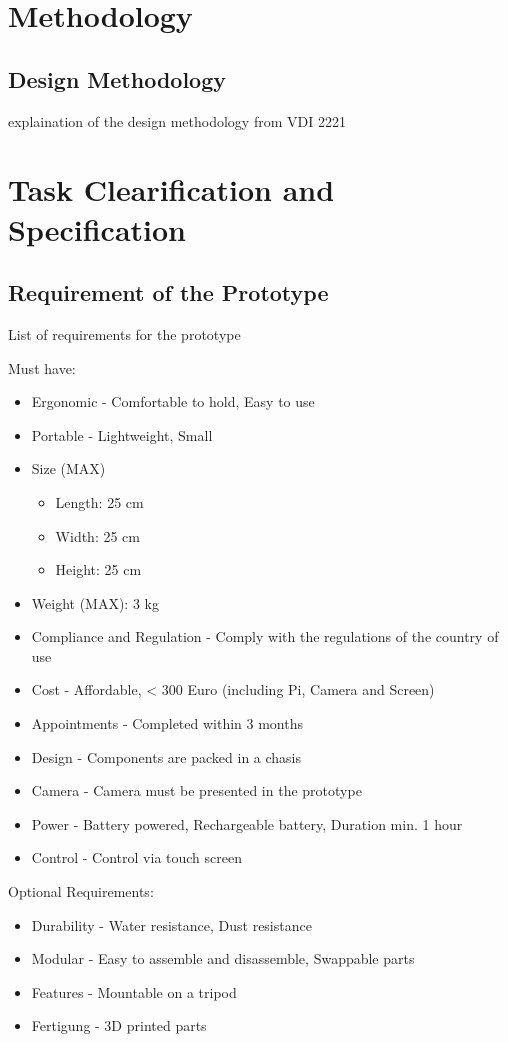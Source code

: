 \chapter{Methodology}

\section{Design Methodology}
explaination of the design methodology from VDI 2221 \cite{Klaus13}


\chapter{Task Clearification and Specification}
\section{Requirement of the Prototype}
\label{sec:requirement}
List of requirements for the prototype

Must have:
\begin{itemize}
    \item Ergonomic - Comfortable to hold, Easy to use
    \item Portable - Lightweight, Small
    \item Size (MAX)
          \begin{itemize}
              \item Length: 25 cm
              \item Width: 25 cm
              \item Height: 25 cm
          \end{itemize}
    \item Weight (MAX): 3 kg
    \item Compliance and Regulation - Comply with the regulations of the country of use
    \item Cost - Affordable, < 300 Euro (including Pi, Camera and Screen)
    \item Appointments - Completed within 3 months
    \item Design - Components are packed in a chasis
    \item Camera - Camera must be presented in the prototype
    \item Power - Battery powered, Rechargeable battery, Duration min. 1 hour
    \item Control - Control via touch screen
\end{itemize}

Optional Requirements:
\begin{itemize}
    \item Durability - Water resistance, Dust resistance
    \item Modular - Easy to assemble and disassemble, Swappable parts
    \item Features - Mountable on a tripod
    \item Fertigung - 3D printed parts

\end{itemize}

